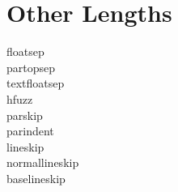 \documentclass{sigchi-alternate}
\begin{document}
\newpage

\section{Other Lengths}

\begin{description}
  \item[floatsep] \the\floatsep
  \item[partopsep] \the\partopsep
  \item[textfloatsep] \the\textfloatsep
  \item[hfuzz] \the\hfuzz
  \item[parskip] \the\parskip
  \item[parindent] \the\parindent
  \item[lineskip] \the\lineskip
  \item[normallineskip] \the\normallineskip
  \item[baselineskip] \the\baselineskip
\end{description}
\end{document}
